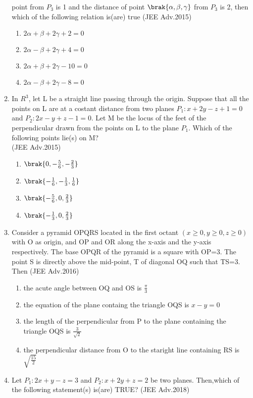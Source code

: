 \begin{enumerate}
		point from $P_3$ is 1 and the distance of point $\brak{\alpha,\beta,\gamma}$ from $P_3$ is 2,  then which of the following relation is(are) true \hfill{(JEE Adv.2015)}
		\begin{enumerate}
			\item $2\alpha+\beta+2\gamma+2=0$
			\item $2\alpha-\beta+2\gamma+4=0$
			\item $2\alpha+\beta+2\gamma-10=0$
			\item $2\alpha-\beta+2\gamma-8=0$
		\end{enumerate}
	\item In $R^3$, let L be a straight line passing through the origin. Suppose that all the points on L are at a costant distance from two planes $P_1:x+2y-z+1=0$ and $P_2:2x-y+z-1=0$. Let M be the
		locus of the feet of the perpendicular drawn from the points on L to the plane $P_1$. Which of the following points lie(s) on M? \\ \hfill{(JEE Adv.2015)}
		\begin{enumerate}
			\item $\brak{0,-\frac{5}{6},-\frac{2}{3}}$
			\item $\brak{-\frac{1}{6},-\frac{1}{3},\frac{1}{6}}$
			\item $\brak{-\frac{5}{6},0,\frac{2}{3}}$
			\item $\brak{-\frac{1}{3},0,\frac{2}{3}}$
		\end{enumerate}
	\item Consider a pyramid OPQRS located in the first octant $(x\geq 0,y\geq 0,z\geq 0)$ with O as origin, and OP and OR along the x-axis and the y-axis respectively. The base OPQR of the pyramid is
		a square with OP=3. The point S is directly above the mid-point, T of diagonal OQ such that TS=3. Then \hfill{(JEE Adv.2016)}
		\begin{enumerate}
			\item the acute angle between OQ and OS is $\frac{\pi}{3}$
			\item the equation of the plane containg the triangle OQS is $x-y=0$
			\item the length of the perpendicular from P to the plane containing the triangle OQS is $\frac{3}{\sqrt{2}}$
			\item the perpendicular distance from O to the staright line containing RS is $\sqrt{\frac{15}{2}}$
		\end{enumerate}
	\item Let $P_1:2x+y-z=3$ and $P_2:x+2y+z=2$ be two planes. Then,which of the following statement(s) is(are) TRUE? \hfill{(JEE Adv.2018)}

\end{enumerate}

